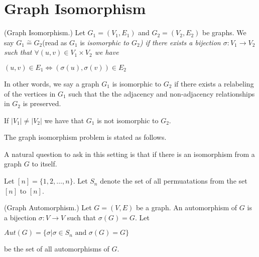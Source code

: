 
\section{Graph Isomorphism}


\begin{definition}(Graph Isomorphism.)
Let $G_1=(V_1,E_1)$ and $G_2=(V_2,E_2)$ be graphs. We say $G_1\stackrel{\sim}{=}G_2$(read as $G_1$ is \em isomorphic to $G_2$) if there exists a bijection $\sigma : V_1\rightarrow V_2$ such that $\forall (u,v) \in V_1\times V_2$ we have
\begin{center}
$(u,v)\in E_1 \iff (\sigma(u),\sigma(v))\in E_2$
\end{center}
\end{definition}

In other words, we say a graph $G_1$ is isomorphic to $G_2$ if there exists a relabeling of the vertices in $G_1$  such that the the adjacency and non-adjacency relationships in $G_2$ is preserved. 
\begin{observation}
If $|V_1|\neq |V_2|$ we have that $G_1$ is not isomorphic to $G_2$.
\end{observation}

The graph isomorphism problem is stated as follows. 
\begin{center}
\end{center}

A natural question to ask in this setting is that if there is an isomorphism from a graph $G$ to itself. 

Let $[n]=\{1,2,\ldots,n\}$. Let $S_n$ denote the set of all permuatations from the set $[n]$ to $[n]$.

\begin{definition}(Graph Automorphism.) 
Let $G=(V,E)$ be a graph. An automorphism of $G$ is a bijection $\sigma:V\rightarrow V$ such that $\sigma(G)= G$. Let
\begin{center}
$Aut(G)= \{\sigma | \sigma\in S_n \text{~and~} \sigma(G)= G \}$
\end{center}
be the set of all automorphisms of $G$. 
\end{definition}




